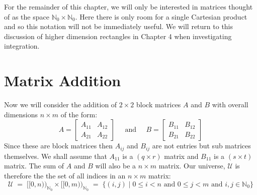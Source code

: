 For the remainder of this chapter, we will only be interested in matrices thought of as the space 
$\mathbb{N}_0 \times \mathbb{N}_0$.
Here there is only room for a single Cartesian product and so this notation will not be immediately useful. 
We will return to this discussion of higher dimension rectangles in Chapter 4 when investigating integration.



\section{Matrix Addition}


Now we will consider the addition of $2 \times 2$ block matrices $A$ and $B$ with overall dimensions $n \times m$ 
of the form:
\begin{equation*}
	A = \left[ \begin{array}{c|c} A_{11} & A_{12} \\ \hline A_{21} & A_{22} \end{array} \right]
	\;\;\;\;\; \text{and} \;\;\;\;\;
	B = \left[ \begin{array}{c|c} B_{11} & B_{12} \\ \hline B_{21} & B_{22} \end{array} \right]
\end{equation*}
Since these are block matrices then $A_{ij}$ and $B_{ij}$ are not entries but sub matrices themselves.
We shall assume that $A_{11}$ is a $(q \times r)$ matrix and $B_{11}$ is a $(s \times t)$ matrix.
The sum of $A$ and $B$ will also be a $n \times m$ matrix.
Our universe, $\mathcal{U}$ is therefore the the set of all indices in an $n \times m$ matrix:
\begin{equation*}
	\mathcal{U} 
		\;=\; [\![0,n)\!)_{\mathbb{N}_0} \times [\![0,m)\!)_{\mathbb{N}_0} 
		\;=\; \{ (i,j) \;|\; 0 \leq i < n \text{ and } 0 \leq j < m \text{ and } i,j \in \mathbb{N}_0 \} 
\end{equation*}


